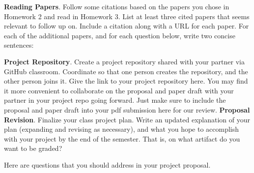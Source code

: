\documentclass[12pt]{exam}
\begin{document}
\begin{questions}
  \question \textbf{Reading Papers}. Follow some citations based on the papers you chose in Homework 2 and read in Homework 3. List at least three cited papers that seems relevant to follow up on. Include a citation along with a URL for each paper. For each of the additional papers, and for each question below, write two concise sentences:
  \question \textbf{Project Repository}. Create a project repository shared with your partner via GitHub classroom. Coordinate so that one person creates the repository, and the other person joins it. Give the link to your project repository here. You may find it more convenient to collaborate on the proposal and paper draft with your partner in your project repo going forward. Just make sure to include the proposal and paper draft into your pdf submission here for our review.
  \question
\textbf{Proposal Revision}. Finalize your class project plan.
%
Write an updated explanation of your plan (expanding and revising as necessary), and what you hope to accomplish with your project by the end of the semester. That is, on what artifact do you want to be graded?

Here are questions that you should address in your project proposal.
\end{questions}
\end{document}

